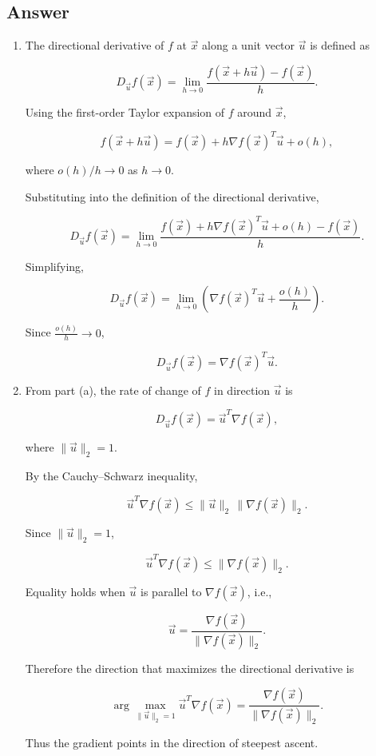 \documentclass[
  12pt,
]{fphw}
\begin{document}
\subsection*{Answer}
\begin{enumerate}

\item[(a)]

The directional derivative of $f$ at $\vec{x}$ along a unit vector $\vec{u}$ is defined as

\[
D_{\vec{u}} f(\vec{x}) =
\lim_{h\to 0} \frac{f(\vec{x}+h\vec{u})-f(\vec{x})}{h}.
\]

Using the first-order Taylor expansion of $f$ around $\vec{x}$,

\[
f(\vec{x}+h\vec{u}) =
f(\vec{x}) + h \nabla f(\vec{x})^T \vec{u} + o(h),
\]

where $o(h)/h \to 0$ as $h \to 0$.

Substituting into the definition of the directional derivative,

\[
D_{\vec{u}} f(\vec{x})
=
\lim_{h\to0}
\frac{f(\vec{x}) + h\nabla f(\vec{x})^T\vec{u} + o(h) - f(\vec{x})}{h}.
\]

Simplifying,

\[
D_{\vec{u}} f(\vec{x})
=
\lim_{h\to0}
\left(
\nabla f(\vec{x})^T\vec{u} + \frac{o(h)}{h}
\right).
\]

Since $\frac{o(h)}{h}\to0$,

\[
D_{\vec{u}} f(\vec{x}) = \nabla f(\vec{x})^T \vec{u}.
\]


\item[(b)]

From part (a), the rate of change of $f$ in direction $\vec{u}$ is

\[
D_{\vec{u}} f(\vec{x}) = \vec{u}^T \nabla f(\vec{x}),
\]

where $\|\vec{u}\|_2 = 1$.

By the Cauchy–Schwarz inequality,

\[
\vec{u}^T \nabla f(\vec{x})
\le
\|\vec{u}\|_2 \, \|\nabla f(\vec{x})\|_2.
\]

Since $\|\vec{u}\|_2 = 1$,

\[
\vec{u}^T \nabla f(\vec{x})
\le
\|\nabla f(\vec{x})\|_2.
\]

Equality holds when $\vec{u}$ is parallel to $\nabla f(\vec{x})$, i.e.,

\[
\vec{u} =
\frac{\nabla f(\vec{x})}{\|\nabla f(\vec{x})\|_2}.
\]

Therefore the direction that maximizes the directional derivative is

\[
\arg\max_{\|\vec{u}\|_2=1} \vec{u}^T \nabla f(\vec{x})
=
\frac{\nabla f(\vec{x})}{\|\nabla f(\vec{x})\|_2}.
\]

Thus the gradient points in the direction of steepest ascent.

\end{enumerate}
\newpage
\end{document}
